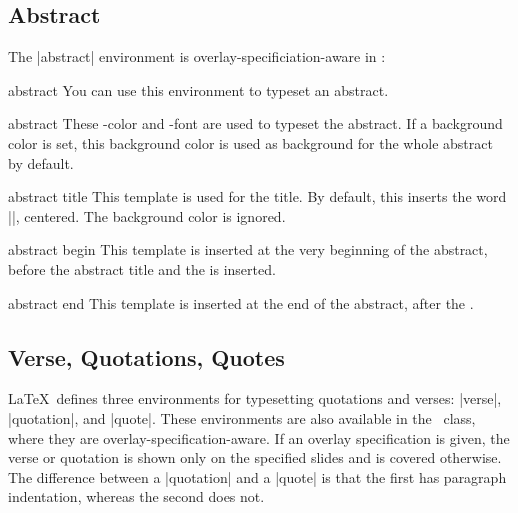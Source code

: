 \subsection{Abstract}

The |abstract| environment is overlay-specificiation-aware in \beamer:


\begin{environment}{{abstract}}
  You can use this environment to typeset an abstract.

  \begin{element}{abstract}\no\yes\yes
    These \beamer-color and -font are used to typeset the abstract. If
    a background color is set, this background color is used as
    background for the whole abstract by default.
  \end{element}

  \begin{element}{abstract title}\yes\yes\yes
    This template is used for the title. By default, this inserts
    the word |\abstractname|, centered. The background color is ignored.
  \end{element}

  \begin{element}{abstract begin}\yes\no\no
    This template is inserted at the very beginning of the abstract,
    before the abstract title and the  is inserted.
  \end{element}

  \begin{element}{abstract end}\yes\no\no
    This template is inserted at the end of the abstract, after the
    .
  \end{element}
\end{environment}




\subsection{Verse, Quotations, Quotes}

\LaTeX\ defines three environments for typesetting quotations and
verses: |verse|, |quotation|, and |quote|. These environments are also
available in the \beamer\ class, where they are
overlay-specification-aware. If an overlay specification is given, the
verse or quotation is shown only on the specified slides and is
covered otherwise. The difference between a |quotation| and a |quote|
is that the first has paragraph indentation, whereas the second does
not.

